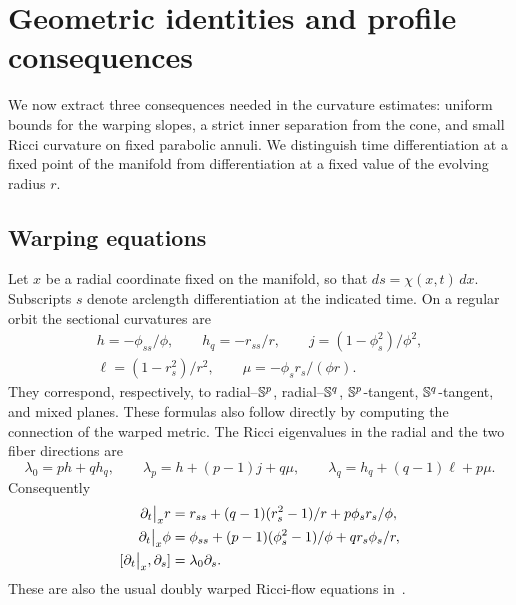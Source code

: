 \section{Geometric identities and profile consequences}\label{sec:geometry}

We now extract three consequences needed in the curvature estimates:
uniform bounds for the warping slopes, a strict inner separation from the
cone, and small Ricci curvature on fixed parabolic annuli. We distinguish
time differentiation at a fixed point of the manifold from differentiation
at a fixed value of the evolving radius \(r\).

\subsection{Warping equations}

Let \(x\) be a radial coordinate fixed on the manifold, so that
\(ds=\chi(x,t)\,dx\). Subscripts \(s\) denote arclength differentiation
at the indicated time. On a regular orbit the sectional curvatures are
\begin{equation}\label{eq:sectional}
\begin{gathered}
h=-\phi_{ss}/\phi,\qquad h_q=-r_{ss}/r,\qquad
j=(1-\phi_s^2)/\phi^2,\\
\ell=(1-r_s^2)/r^2,\qquad
\mu=-\phi_s r_s/(\phi r).
\end{gathered}
\end{equation}
They correspond, respectively, to radial--\(\mathbb S^p\), radial--\(\mathbb S^q\),
\(\mathbb S^p\)-tangent, \(\mathbb S^q\)-tangent, and mixed planes. These formulas
also follow directly by computing the connection of the warped metric.
The Ricci eigenvalues in the radial and the two fiber directions are
\begin{equation}\label{eq:ricci-eigenvalues}
\lambda_0=ph+qh_q,\qquad
\lambda_p=h+(p-1)j+q\mu,\qquad
\lambda_q=h_q+(q-1)\ell+p\mu.
\end{equation}
Consequently
\begin{equation}\label{eq:warping-flow}
\begin{aligned}
\dt\big|_x r&=r_{ss}+(q-1)(r_s^2-1)/r+p\phi_s r_s/\phi,\\
\dt\big|_x\phi&=\phi_{ss}+(p-1)(\phi_s^2-1)/\phi+q r_s\phi_s/r,\\
[\dt\big|_x,\partial_s]&=\lambda_0\partial_s.
\end{aligned}
\end{equation}
These are also the usual doubly warped Ricci-flow equations
in~\cite[Section~2]{Stolarski2019}.

